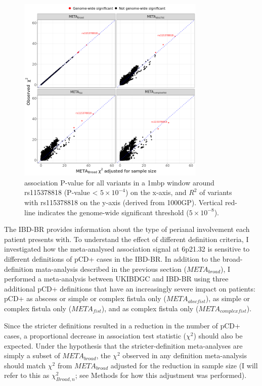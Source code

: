 \begin{figure}[H] 
  \centering    
  \includegraphics[width=0.8\textwidth]{Vector/meta_chisq_plot}
  \caption[Figure]{association P-value for all variants in a 1mbp window around rs115378818 (P-value < $5\times10^{-4}$) on the x-axis, and $R^{2}$ of variants with rs115378818 on the y-axis (derived from 1000GP). Vertical red-line indicates the genome-wide significant threshold ($5\times10^{-8}$).}
  \label{fig:meta_def_comparison}
  \end{figure}
The IBD-BR provides information about the type of perianal involvement each patient presents with. To understand the effect of different definition criteria, I investigated how the meta-analysed association signal at 6p21.32 is sensitive to different definitions of pCD+ cases in the IBD-BR. In addition to the broad-definition mata-analysis described in the previous section ($META_{broad}$), I performed a meta-analysis between UKIBDGC and IBD-BR using three additional pCD+ definitions that have an increasingly severe impact on patients: pCD+ as abscess or simple or complex fistula only ($META_{abscfist}$), as simple or complex fistula only ($META_{fist}$), and as complex fistula only ($META_{complexfist}$). 

Since the stricter definitions resulted in a reduction in the number of pCD+ cases, a proportional decrease in association test statistic ($\chi^{2}$) should also be expected. Under the hypothesis that the stricter-definition meta-analyses are simply a subset of $META_{broad}$, the $\chi^{2}$  observed in any definition meta-analysis should match $\chi^{2}$ from $META_{broad}$ adjusted for the reduction in sample size (I will refer to this as $\chi^{2}_{Broad,n}$; see Methods for how this adjustment was performed). 

